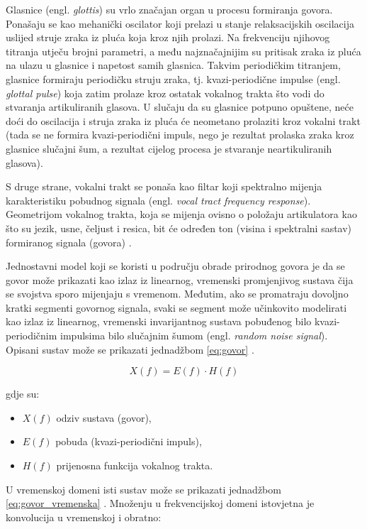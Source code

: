 Glasnice (engl. \textit{glottis}) su vrlo značajan organ u procesu formiranja govora. 
Ponašaju se kao mehanički
oscilator koji prelazi u stanje relaksacijskih oscilacija uslijed struje zraka iz pluća koja kroz njih
prolazi. Na frekvenciju njihovog titranja utječu brojni parametri, a među najznačajnijim su
pritisak zraka iz pluća na ulazu u glasnice i napetost samih glasnica.
Takvim periodičkim titranjem, glasnice formiraju periodičku struju zraka, tj. 
kvazi-periodične impulse (engl. \textit{glottal pulse}) koja zatim prolaze kroz ostatak 
vokalnog trakta što vodi do stvaranja artikuliranih glasova. U slučaju da 
su glasnice potpuno opuštene, neće
doći do oscilacija i struja zraka iz pluća će neometano prolaziti kroz vokalni trakt 
(tada se ne formira kvazi-periodični impuls, nego je rezultat prolaska zraka kroz glasnice
slučajni šum, a rezultat cijelog procesa je stvaranje neartikuliranih glasova). 

S druge strane, vokalni trakt se ponaša kao filtar koji spektralno mijenja karakteristiku
pobudnog signala (engl. \textit{vocal tract frequency response}). 
Geometrijom vokalnog trakta, koja se mijenja ovisno o položaju 
artikulatora kao što su jezik, usne, čeljust i resica, bit će određen ton (visina i
spektralni sastav) formiranog signala (govora) \cite{petrinovic2002}. 

Jednostavni model koji se koristi u području obrade prirodnog govora je da se govor 
može prikazati kao izlaz iz linearnog, vremenski promjenjivog sustava čija se 
svojstva sporo mijenjaju s vremenom. Međutim, ako se promatraju dovoljno kratki
segmenti govornog signala, svaki se segment može učinkovito modelirati kao izlaz
iz linearnog, vremenski invarijantnog sustava pobuđenog bilo
kvazi-periodičnim impulsima bilo slučajnim šumom (engl. \textit{random noise signal}).
Opisani sustav može se prikazati jednadžbom \eqref{eq:govor} .

\begin{equation}
    X(f) = E(f) \cdot H(f)
    \label{eq:govor}
\end{equation}

gdje su:
\begin{itemize}
    \item \(X(f)\) odziv sustava (govor),
    \item \(E(f)\) pobuda (kvazi-periodični impuls),
    \item \(H(f)\) prijenosna funkcija vokalnog trakta.
\end{itemize}

U vremenskoj domeni isti sustav može se prikazati jednadžbom \eqref{eq:govor_vremenska} .
Množenju u frekvencijskoj domeni istovjetna je konvolucija u vremenskoj i obratno:

